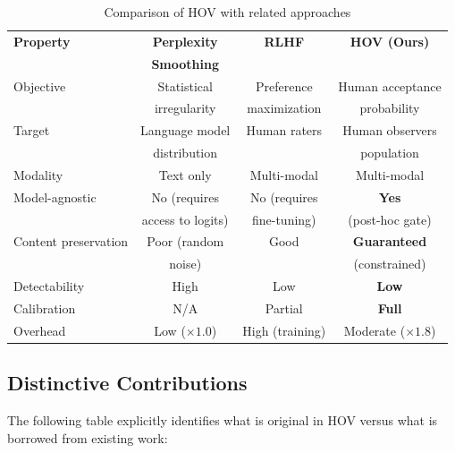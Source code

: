 \documentclass[12pt,oneside]{article}
\begin{document}
{{{{{{{{{{{\begin{table}[H]
\centering
\caption{Comparison of HOV with related approaches}
\begin{tabular}{@{}lccc@{}}
\toprule
\textbf{Property} & \textbf{Perplexity} & \textbf{RLHF} & \textbf{HOV (Ours)} \\
& \textbf{Smoothing} & & \\
\midrule
Objective & Statistical & Preference & Human acceptance \\
& irregularity & maximization & probability \\
Target & Language model & Human raters & Human observers \\
& distribution & & population \\
Modality & Text only & Multi-modal & Multi-modal \\
Model-agnostic & No (requires & No (requires & \textbf{Yes} \\
& access to logits) & fine-tuning) & (post-hoc gate) \\
Content preservation & Poor (random & Good & \textbf{Guaranteed} \\
& noise) & & (constrained) \\
Detectability & High & Low & \textbf{Low} \\
Calibration & N/A & Partial & \textbf{Full} \\
Overhead & Low ($\times 1.0$) & High (training) & Moderate ($\times 1.8$) \\
\bottomrule
\end{tabular}
\end{table}

\subsection{Distinctive Contributions}

The following table explicitly identifies what is original in HOV versus what is borrowed from existing work:

}}}}}}}}}}}
\end{document}
